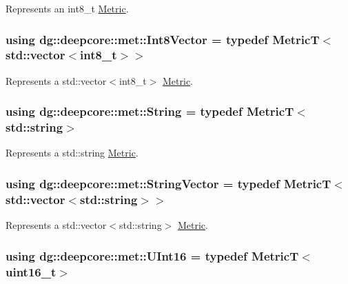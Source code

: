 Represents an {\ttfamily int8\+\_\+t} \hyperlink{classdg_1_1deepcore_1_1_metric}{Metric}. 

\subsubsection[{\texorpdfstring{Int8\+Vector}{Int8Vector}}]{\setlength{\rightskip}{0pt plus 5cm}using {\bf dg\+::deepcore\+::met\+::\+Int8\+Vector} = typedef MetricT$<$std\+::vector$<$int8\+\_\+t$>$$>$}\hypertarget{group___process_metrics_gacb7db62769772226cbad4d2d10b790f5}{}\label{group___process_metrics_gacb7db62769772226cbad4d2d10b790f5}


Represents a {\ttfamily std\+::vector$<$int8\+\_\+t$>$} \hyperlink{classdg_1_1deepcore_1_1_metric}{Metric}. 

\subsubsection[{\texorpdfstring{String}{String}}]{\setlength{\rightskip}{0pt plus 5cm}using {\bf dg\+::deepcore\+::met\+::\+String} = typedef MetricT$<$std\+::string$>$}\hypertarget{group___process_metrics_ga0b257f8c37ca91b205247869b5551dfc}{}\label{group___process_metrics_ga0b257f8c37ca91b205247869b5551dfc}


Represents a {\ttfamily std\+::string} \hyperlink{classdg_1_1deepcore_1_1_metric}{Metric}. 

\subsubsection[{\texorpdfstring{String\+Vector}{StringVector}}]{\setlength{\rightskip}{0pt plus 5cm}using {\bf dg\+::deepcore\+::met\+::\+String\+Vector} = typedef MetricT$<$std\+::vector$<$std\+::string$>$$>$}\hypertarget{group___process_metrics_gac7024897060861b0e561fca42cea8aeb}{}\label{group___process_metrics_gac7024897060861b0e561fca42cea8aeb}


Represents a {\ttfamily std\+::vector$<$std\+::string$>$} \hyperlink{classdg_1_1deepcore_1_1_metric}{Metric}. 

\subsubsection[{\texorpdfstring{U\+Int16}{UInt16}}]{\setlength{\rightskip}{0pt plus 5cm}using {\bf dg\+::deepcore\+::met\+::\+U\+Int16} = typedef MetricT$<$uint16\+\_\+t$>$}\hypertarget{group___process_metrics_ga234f31e63c02211edabdbc7423c4e0ab}{}\label{group___process_metrics_ga234f31e63c02211edabdbc7423c4e0ab}


